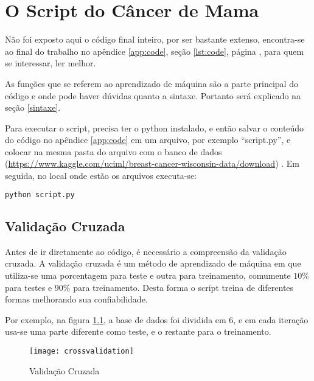 \chapter{O Script do Câncer de Mama}
\label{chapter:o_script_do_cancer_de_mama}


Não foi exposto aqui o código final inteiro, por ser bastante extenso, encontra-se ao final do trabalho no apêndice \ref{app:code}, seção
\ref{lst:code}, página \pageref{lst:code}, para quem se interessar, ler melhor.

As funções que se referem ao aprendizado de máquina são a parte principal do código e onde pode haver dúvidas quanto a sintaxe.
Portanto será explicado na seção \ref{sintaxe}.

Para executar o script, precisa ter o python \cite{PYTHON} instalado,
e então salvar o conteúdo do código no apêndice \ref{app:code} em um arquivo, por exemplo ``script.py'',
e colocar na mesma pasta do arquivo com o banco de dados
(\url{https://www.kaggle.com/uciml/breast-cancer-wisconsin-data/download}) \cite{BREASTCANCER}.
Em seguida, no local onde estão os arquivos executa-se:

\begin{lstlisting}[language=Python, caption=Executar Script.py]
python script.py
\end{lstlisting}

\section{Validação Cruzada}

Antes de ir diretamente ao código, é necessário a compreensão da validação cruzada.
A validação cruzada é um método de aprendizado de máquina em que utiliza-se uma
porcentagem para teste e outra para treinamento, comumente $10\%$ para testes e $90\%$ para treinamento.
Desta forma o script treina de diferentes formas melhorando sua confiabilidade.


Por exemplo, na figura \ref{fig:crossvalidation}, a base de dados foi dividida em 6,
e em cada iteração usa-se uma parte diferente como teste, e o restante para o treinamento.

\begin{figure}[H]
\begin{center}
\caption{Validação Cruzada}
\texttt{[image: crossvalidation]}
\label{fig:crossvalidation}
\end{center}
\end{figure}

